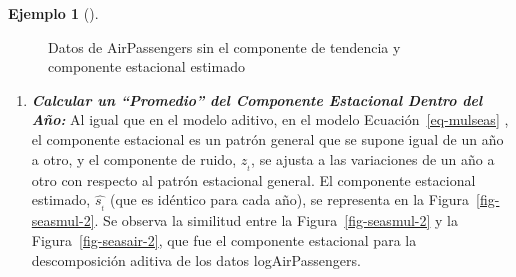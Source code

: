 \documentclass[
  us-letterpaper,
]{scrreprt}
\theoremstyle{plain}
\theoremstyle{definition}
\newtheorem{example}{Ejemplo}[chapter]
\theoremstyle{plain}
\theoremstyle{definition}
\theoremstyle{remark}
\begin{document}
\begin{example}[]
\begin{tcolorbox}
\begin{figure}[H]
\begin{minipage}{0.50\linewidth}
{}


\end{minipage}%
%
\begin{minipage}{0.50\linewidth}



\end{minipage}%

\caption{\label{fig-seasmul}Datos de AirPassengers sin el componente de
tendencia y componente estacional estimado}

\end{figure}%

\begin{enumerate}
\def\labelenumi{\alph{enumi}.}
\setcounter{enumi}{2}
\item
  \textbf{\emph{Calcular un ``Promedio'' del Componente Estacional
  Dentro del Año:}} Al igual que en el modelo aditivo, en el modelo
  Ecuación~\ref{eq-mulseas} , el componente estacional es un patrón
  general que se supone igual de un año a otro, y el componente de
  ruido, \(z_{_t}\), se ajusta a las variaciones de un año a otro con
  respecto al patrón estacional general. El componente estacional
  estimado, \(\hat{s_{_t}}\) (que es idéntico para cada año), se
  representa en la Figura~\ref{fig-seasmul-2}. Se observa la similitud
  entre la Figura~\ref{fig-seasmul-2} y la Figura~\ref{fig-seasair-2},
  que fue el componente estacional para la descomposición aditiva de los
  datos logAirPassengers.


\end{enumerate}
\end{tcolorbox}
\end{example}
\end{document}
